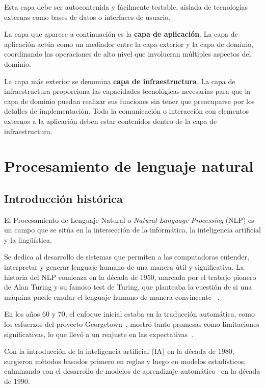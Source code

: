 Esta capa debe ser autocontenida y fácilmente testable, aislada de tecnologías externas como bases de datos o
interfaces de usuario.

La capa que aparece a continuación es la \textbf{capa de aplicación}.
La capa de aplicación actúa como un mediador entre la capa exterior y la capa de dominio, coordinando las operaciones
de alto nivel que involucran múltiples aspectos del dominio.

La capa más exterior se denomina \textbf{capa de infraestructura}.
La capa de infraestructura proporciona las capacidades tecnológicas necesarias para que la capa de dominio puedan
realizar sus funciones sin tener que preocuparse por los detalles de implementación.
Toda la comunicación o interacción con elementos externos a la aplicación deben estar contenidos dentro de la capa de
infraestructura.


\section{Procesamiento de lenguaje natural}

\subsection*{Introducción histórica}
El Procesamiento de Lenguaje Natural o \textit{Natural Language Processing} (NLP) es un campo que se sitúa en la
intersección de la informática, la inteligencia artificial y la lingüística.

Se dedica al desarrollo de sistemas que permiten a las computadoras entender, interpretar y generar lenguaje humano de
una manera útil y significativa.
La historia del NLP comienza en la década de 1950, marcada por el trabajo pionero de Alan Turing y su famoso
test de Turing, que planteaba la cuestión de si una máquina puede emular el lenguaje humano de manera convincente
~\cite{article_touring_1950}.

En los años 60 y 70, el enfoque inicial estaba en la traducción automática, como los esfuerzos del proyecto
Georgetown~\cite{techreport_georgetown_1964}, mostró tanto promesas como limitaciones significativas, lo
que llevó a un reajuste en las expectativas~\cite{article_hutchins_2003}.

Con la introducción de la inteligencia artificial (IA) en la década de 1980, surgieron métodos basados primero en reglas
y luego en modelos estadísticos, culminando con el desarrollo de
modelos de aprendizaje automático~\cite{article_manning_1999} en la década de 1990.

